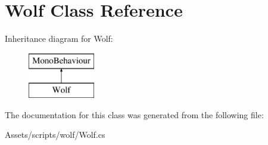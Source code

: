 \hypertarget{class_wolf}{}\section{Wolf Class Reference}
\label{class_wolf}
Inheritance diagram for Wolf\+:\begin{figure}[H]
\begin{center}
\leavevmode
\includegraphics[height=2.000000cm]{class_wolf}
\end{center}
\end{figure}


The documentation for this class was generated from the following file\+:\begin{DoxyCompactItemize}
\item 
Assets/scripts/wolf/Wolf.\+cs\end{DoxyCompactItemize}
